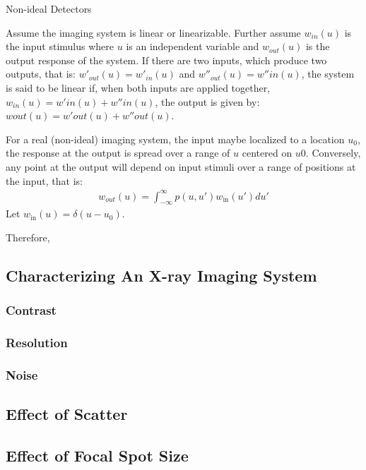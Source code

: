 \documentclass[mphy386-notes.tex]{subfiles}
\begin{document}
Non-ideal Detectors

Assume the imaging system is linear or linearizable. Further assume $w_{in}(u)$
is the input stimulus where $u$ is an independent variable and $w_{out}(u)$ is
the output response of the system. If there are two inputs, which produce two
outputs, that is: $w'_{out}(u) = w'_{in}(u)$ and $w''_{out}(u) = w''in(u)$, the
system is said to be linear if, when both inputs are applied together, $w_{in}(u) =
w'in(u) + w''in(u)$, the output is given by: $wout(u) = w'out(u) + w''out(u)$.

For a real (non-ideal) imaging system, the input maybe localized to a location
$u_0$, the response at the output is spread over a range of $u$ centered on
$u0$. Conversely, any point at the output will depend on input stimuli over a
range of positions at the input, that is:
\begin{align*}
  w_{out}(u) = \int_{-\infty}^{\infty} p(u, u') w_{\text{in}}(u')du'
\end{align*}
Let $w_{\text{in}}(u) = \delta(u - u_0)$. 


Therefore,


\subsection{Characterizing An X-ray Imaging System}
\subsubsection{Contrast}
\subsubsection{Resolution}
\subsubsection{Noise}
\subsection{Effect of Scatter}
\subsection{Effect of Focal Spot Size}


\pagebreak
\end{document}
